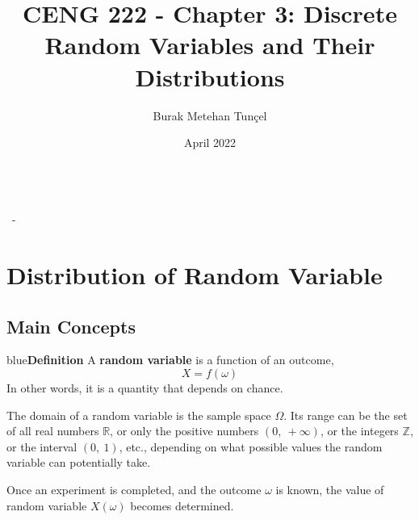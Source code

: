 \documentclass{article}
\title{CENG 222 - Chapter 3: Discrete Random Variables and Their Distributions}
\author{Burak Metehan Tunçel}
\date{April 2022}
\makeatletter
\newenvironment{definition}[1]{\begin{mybox}{blue}{\textbf{Definition #1}}}{\end{mybox}}
\renewcommand\maketitle{
{\raggedright %
\begin{center}
{\Large \bfseries \@title}\\[2ex] 
{\large \@author \ - \@date}\\[2ex]
\end{center}}} %
\makeatother
\begin{document}
\maketitle

\section{Distribution of Random Variable}

\subsection{Main Concepts}

\begin{definition}{}
A \textbf{random variable} is a function of an outcome,
\begin{equation*}
    X = f(\omega)
\end{equation*}
In other words, it is a quantity that depends on chance.
\end{definition}

The domain of a random variable is the sample space $\Omega$. Its range can be the set of all real numbers $\mathbb{R}$, or only the positive numbers $(0,\ +\infty)$, or the integers $\mathbb{Z}$, or the interval $(0,\ 1)$, etc., depending on what possible values the random variable can potentially take.

Once an experiment is completed, and the outcome $\omega$ is known, the value of random variable $X(\omega)$ becomes determined.
\end{document}
